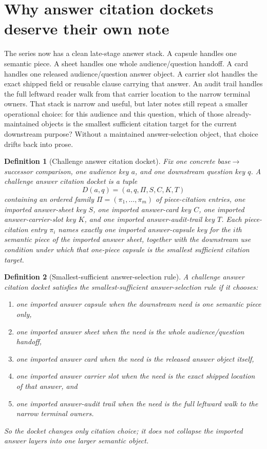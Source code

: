\documentclass[11pt]{article}
\newtheorem{definition}{Definition}
\begin{document}
\section{Why answer citation dockets deserve their own note}
The series now has a clean late-stage answer stack.
A capsule handles one semantic piece.
A sheet handles one whole audience/question handoff.
A card handles one released audience/question answer object.
A carrier slot handles the exact shipped field or reusable clause carrying that answer.
An audit trail handles the full leftward reader walk from that carrier location to the narrow terminal owners.
That stack is narrow and useful, but later notes still repeat a smaller operational choice: for this audience and this question, which of those already-maintained objects is the smallest sufficient citation target for the current downstream purpose?
Without a maintained answer-selection object, that choice drifts back into prose.

\begin{definition}[Challenge answer citation docket]
Fix one concrete base$\to$successor comparison, one audience key $a$, and one downstream question key $q$.
A \emph{challenge answer citation docket} is a tuple
\[
D(a,q)=(a,q,\Pi,S,C,K,T)
\]
containing an ordered family $\Pi=(\pi_1,\dots,\pi_m)$ of piece-citation entries, one imported answer-sheet key $S$, one imported answer-card key $C$, one imported answer-carrier-slot key $K$, and one imported answer-audit-trail key $T$.
Each piece-citation entry $\pi_i$ names exactly one imported answer-capsule key for the $i$th semantic piece of the imported answer sheet, together with the downstream use condition under which that one-piece capsule is the smallest sufficient citation target.
\end{definition}

\begin{definition}[Smallest-sufficient answer-selection rule]
A challenge answer citation docket satisfies the \emph{smallest-sufficient answer-selection rule} if it chooses:
\begin{enumerate}[leftmargin=*]
\item one imported answer capsule when the downstream need is one semantic piece only,
\item one imported answer sheet when the need is the whole audience/question handoff,
\item one imported answer card when the need is the released answer object itself,
\item one imported answer carrier slot when the need is the exact shipped location of that answer, and
\item one imported answer-audit trail when the need is the full leftward walk to the narrow terminal owners.
\end{enumerate}
So the docket changes only citation choice; it does not collapse the imported answer layers into one larger semantic object.
\end{definition}
\end{document}

